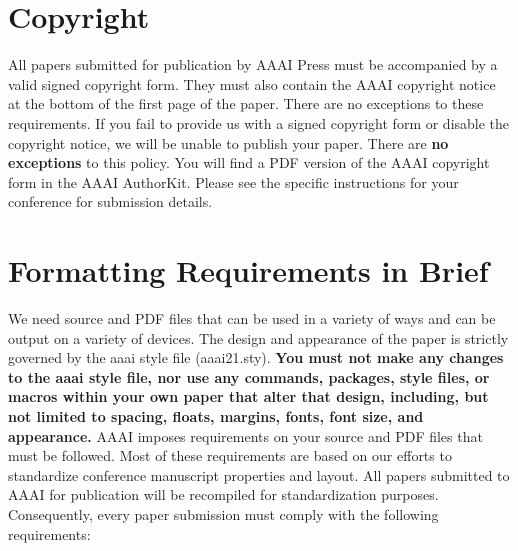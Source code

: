 \documentclass[letterpaper]{article} \usepackage{aaai21}  \usepackage{times}  \usepackage{helvet} \usepackage{courier}  \usepackage[hyphens]{url}  \usepackage{graphicx} \urlstyle{rm} \def\UrlFont{\rm}  \usepackage{natbib}  \usepackage{caption} \frenchspacing  \setlength{\pdfpagewidth}{8.5in}  \setlength{\pdfpageheight}{11in}  \usepackage{cite}
\begin{document}
\section{Copyright}
All papers submitted for publication by AAAI Press must be accompanied by a valid signed copyright form. They must also contain the AAAI copyright notice at the bottom of the first page of the paper. There are no exceptions to these requirements. If you fail to provide us with a signed copyright form or disable the copyright notice, we will be unable to publish your paper. There are \textbf{no exceptions} to this policy. You will find a PDF version of the AAAI copyright form in the AAAI AuthorKit. Please see the specific instructions for your conference for submission details.

\section{Formatting Requirements in Brief}
We need source and PDF files that can be used in a variety of ways and can be output on a variety of devices. The design and appearance of the paper is strictly governed by the aaai style file (aaai21.sty).
\textbf{You must not make any changes to the aaai style file, nor use any commands, packages, style files, or macros within your own paper that alter that design, including, but not limited to spacing, floats, margins, fonts, font size, and appearance.} AAAI imposes requirements on your source and PDF files that must be followed. Most of these requirements are based on our efforts to standardize conference manuscript properties and layout. All papers submitted to AAAI for publication will be recompiled for standardization purposes. Consequently, every paper submission must comply with the following requirements:
\end{document}

